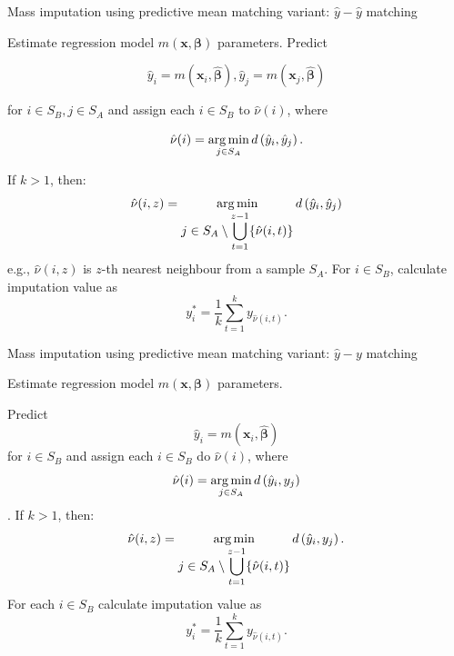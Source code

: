 \documentclass[
]{jss}
\begin{document}
\begin{algorithm}[ht!]
\caption{Mass imputation using predictive mean matching variant: $\hat{y}-\hat{y}$ matching}
\label{algo-3}
\begin{algorithmic}[1]
\State Estimate regression model $m(\boldsymbol{x}, \boldsymbol{\beta})$ parameters.\;
\State Predict 

$$\hat{y}_{i}=m\left(\boldsymbol{x}_{i},\hat{\boldsymbol{\beta}}\right),  \hat{y}_{j}=m\left(\boldsymbol{x}_{j},\hat{\boldsymbol{\beta}}\right)$$

for $i\in S_{B}, j\in S_{A}$ and assign each  $i\in S_{B}$ to $\hat{\nu}(i)$, where

$$
\displaystyle \hat{\nu}(i)=
\operatornamewithlimits{arg\,min}_{j\in S_{A}}d\left(\hat{y}_{i},\hat{y}_{j}\right).
$$ 

\State If $k>1$, then:
$$
\hat{\nu}(i, z) = \operatornamewithlimits{arg\,min}_{\displaystyle j\in S_{A}\setminus\bigcup_{t=1}^{z-1}
\{\hat{\nu}(i, t)\}} d\left(\hat{y}_{i},\hat{y}_{j}\right)
$$
e.g., $\hat{\nu}(i, z)$ is $z$-th nearest neighbour from a sample $S_A$.\;
\State For $i \in S_B$, calculate imputation value as 
$$
y_i^* = \frac{1}{k}\sum_{t=1}^{k}y_{\hat{\nu}(i, t)}.
$$
\end{algorithmic}
\end{algorithm}

\begin{algorithm}[ht!]
\caption{Mass imputation using predictive mean matching variant: $\hat{y}-y$ matching}
\label{algo-4}
\begin{algorithmic}[1]

\State Estimate regression model $m(\boldsymbol{x}, \boldsymbol{\beta})$ parameters.\;

\State Predict 
$$
\hat{y}_{i}=m\left(\boldsymbol{x}_{i},\hat{\boldsymbol{\beta}}\right)
$$  for $i \in S_{B}$ 
and assign each  $i \in S_{B}$ do $\hat{\nu}(i)$, where
$$
\displaystyle \hat{\nu}(i)=
\operatornamewithlimits{arg\,min}_{j \in S_{A}}d\left(\hat{y}_{i},y_{j}\right)
$$.\;
\State If $k>1$, then:
$$
\hat{\nu}(i, z) = \operatornamewithlimits{arg\,min}_{\displaystyle j \in S_{A} \setminus \bigcup_{t=1}^{z-1}
\{\hat{\nu}(i, t)\}} d\left(\hat{y}_{i},y_{j}\right).
$$
\State For each $i \in S_B$ calculate imputation value as
$$
y_i^* = \frac{1}{k}\sum_{t=1}^{k}y_{\hat{\nu}(i, t)}.
$$
\end{algorithmic}
\end{algorithm}

\newpage


\end{document}
